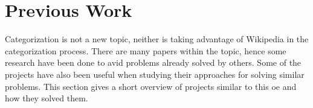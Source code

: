 \chapter{Previous Work}
Categorization is not a new topic, neither is taking advantage of Wikipedia in the categorization process. There are many papers within the topic, hence some research have been done to avid problems already solved by others. Some of the projects have also been useful when studying their approaches for solving similar problems. This section gives a short overview of projects similar to this oe and how they solved them.












